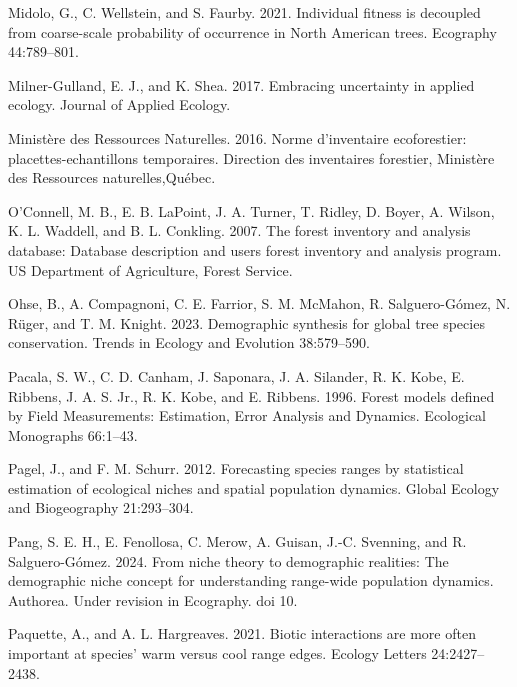 \documentclass[12pt]{article}
\newlength{\cslhangindent}
\newenvironment{cslreferences}%
  {\setlength{\parindent}{0pt}%
  \everypar{\setlength{\hangindent}{\cslhangindent}}\ignorespaces}%
  {\par}
\begin{document}
\begin{cslreferences}
\leavevmode\hypertarget{ref-Midolo2021}{}%
Midolo, G., C. Wellstein, and S. Faurby. 2021. Individual fitness is
decoupled from coarse-scale probability of occurrence in North American
trees. Ecography 44:789--801.

\leavevmode\hypertarget{ref-MilnerGulland2017a}{}%
Milner-Gulland, E. J., and K. Shea. 2017. Embracing uncertainty in
applied ecology. Journal of Applied Ecology.

\leavevmode\hypertarget{ref-Naturelles2016}{}%
Ministère des Ressources Naturelles. 2016. Norme d'inventaire
ecoforestier: placettes-echantillons temporaires. Direction des
inventaires forestier, Ministère des Ressources naturelles,Québec.

\leavevmode\hypertarget{ref-OConnell2007}{}%
O'Connell, M. B., E. B. LaPoint, J. A. Turner, T. Ridley, D. Boyer, A.
Wilson, K. L. Waddell, and B. L. Conkling. 2007. The forest inventory
and analysis database: Database description and users forest inventory
and analysis program. US Department of Agriculture, Forest Service.

\leavevmode\hypertarget{ref-Ohse2023}{}%
Ohse, B., A. Compagnoni, C. E. Farrior, S. M. McMahon, R.
Salguero-Gómez, N. Rüger, and T. M. Knight. 2023. Demographic synthesis
for global tree species conservation. Trends in Ecology and Evolution
38:579--590.

\leavevmode\hypertarget{ref-Pacala1996a}{}%
Pacala, S. W., C. D. Canham, J. Saponara, J. A. Silander, R. K. Kobe, E.
Ribbens, J. A. S. Jr., R. K. Kobe, and E. Ribbens. 1996. Forest models
defined by Field Measurements: Estimation, Error Analysis and Dynamics.
Ecological Monographs 66:1--43.

\leavevmode\hypertarget{ref-Pagel2012}{}%
Pagel, J., and F. M. Schurr. 2012. Forecasting species ranges by
statistical estimation of ecological niches and spatial population
dynamics. Global Ecology and Biogeography 21:293--304.

\leavevmode\hypertarget{ref-pang2024niche}{}%
Pang, S. E. H., E. Fenollosa, C. Merow, A. Guisan, J.-C. Svenning, and
R. Salguero-Gómez. 2024. From niche theory to demographic realities: The
demographic niche concept for understanding range-wide population
dynamics. Authorea. Under revision in Ecography. doi 10.

\leavevmode\hypertarget{ref-Paquette2021}{}%
Paquette, A., and A. L. Hargreaves. 2021. Biotic interactions are more
often important at species' warm versus cool range edges. Ecology
Letters 24:2427--2438.


\end{cslreferences}
\end{document}
